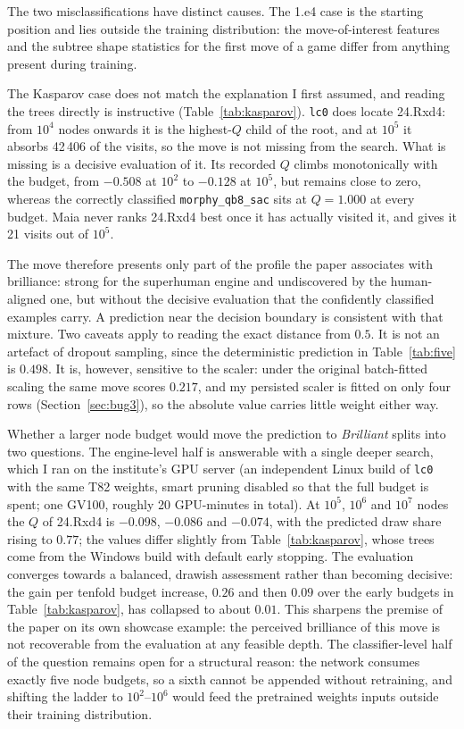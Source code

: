 \documentclass[11pt,a4paper]{article}
\begin{document}
The two misclassifications have distinct causes. The 1.e4 case is the
starting position and lies outside the training distribution: the
move-of-interest features and the subtree shape statistics for the
first move of a game differ from anything present during training.

The Kasparov case does not match the explanation I first assumed, and
reading the trees directly is instructive
(Table~\ref{tab:kasparov}). \texttt{lc0} does locate 24.Rxd4: from
$10^4$ nodes onwards it is the highest-$Q$ child of the root, and at
$10^5$ it absorbs 42\,406 of the visits, so the move is not missing
from the search. What is missing is a decisive evaluation of it. Its
recorded $Q$ climbs monotonically with the budget, from $-0.508$ at
$10^2$ to $-0.128$ at $10^5$, but remains close to zero, whereas the
correctly classified \texttt{morphy\_qb8\_sac} sits at $Q = 1.000$ at
every budget. Maia never ranks 24.Rxd4 best once it has actually
visited it, and gives it 21 visits out of $10^5$.

The move therefore presents only part of the profile the paper
associates with brilliance: strong for the superhuman engine and
undiscovered by the human-aligned one, but without the decisive
evaluation that the confidently classified examples carry. A prediction
near the decision boundary is consistent with that mixture. Two
caveats apply to reading the exact distance from $0.5$. It is not an
artefact of dropout sampling, since the deterministic prediction in
Table~\ref{tab:five} is $0.498$. It is, however, sensitive to the
scaler: under the original batch-fitted scaling the same move scores
$0.217$, and my persisted scaler is fitted on only four rows
(Section~\ref{sec:bug3}), so the absolute value carries little weight
either way.

Whether a larger node budget would move the prediction to
\emph{Brilliant} splits into two questions. The engine-level half is
answerable with a single deeper search, which I ran on the institute's
GPU server (an independent Linux build of \texttt{lc0} with the same
T82 weights, smart pruning disabled so that the full budget is spent;
one GV100, roughly 20 GPU-minutes in total). At $10^5$, $10^6$ and
$10^7$ nodes the $Q$ of 24.Rxd4 is $-0.098$, $-0.086$ and $-0.074$,
with the predicted draw share rising to $0.77$; the values differ
slightly from Table~\ref{tab:kasparov}, whose trees come from the
Windows build with default early stopping. The evaluation converges
towards a balanced, drawish assessment rather than becoming decisive:
the gain per tenfold budget increase, $0.26$ and then $0.09$ over the
early budgets in Table~\ref{tab:kasparov}, has collapsed to about
$0.01$. This sharpens the premise of the paper on its own showcase
example: the perceived brilliance of this move is not recoverable from
the evaluation at any feasible depth. The classifier-level half of the
question remains open for a structural reason: the network consumes
exactly five node budgets, so a sixth cannot be appended without
retraining, and shifting the ladder to $10^2$--$10^6$ would feed the
pretrained weights inputs outside their training distribution.
\end{document}

